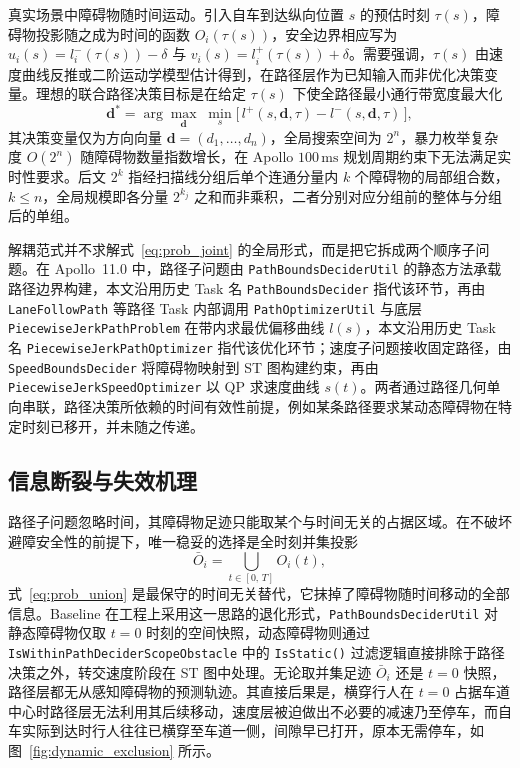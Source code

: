 \documentclass[a4paper,zihao=5]{ctexart}
\theoremstyle{definition}
\begin{document}
真实场景中障碍物随时间运动。引入自车到达纵向位置 $s$ 的预估时刻 $\tau(s)$，障碍物投影随之成为时间的函数 $O_i(\tau(s))$，安全边界相应写为 $u_i(s) = l_i^{-}(\tau(s)) - \delta$ 与 $v_i(s) = l_i^{+}(\tau(s)) + \delta$。需要强调，$\tau(s)$ 由速度曲线反推或二阶运动学模型估计得到，在路径层作为已知输入而非优化决策变量。理想的联合路径决策目标是在给定 $\tau(s)$ 下使全路径最小通行带宽度最大化
\begin{equation}
    \mathbf{d}^{*} = \arg\max_{\mathbf{d}} \;\min_{s} \big[\,l^{+}(s, \mathbf{d}, \tau) - l^{-}(s, \mathbf{d}, \tau)\,\big],
    \label{eq:prob_joint}
\end{equation}
其决策变量仅为方向向量 $\mathbf{d} = (d_1, \ldots, d_n)$，全局搜索空间为 $2^n$，暴力枚举复杂度 $O(2^n)$ 随障碍物数量指数增长，在 Apollo $100\,\mathrm{ms}$ 规划周期约束下无法满足实时性要求。后文 $2^k$ 指经扫描线分组后单个连通分量内 $k$ 个障碍物的局部组合数，$k \leq n$，全局规模即各分量 $2^{k_j}$ 之和而非乘积，二者分别对应分组前的整体与分组后的单组。

{\sloppy 解耦范式并不求解式~\eqref{eq:prob_joint} 的全局形式，而是把它拆成两个顺序子问题。在 Apollo~11.0 中，路径子问题由 \texttt{PathBoundsDeciderUtil} 的静态方法承载路径边界构建，本文沿用历史 Task 名 \texttt{PathBoundsDecider} 指代该环节，再由 \texttt{LaneFollowPath} 等路径 Task 内部调用 \texttt{PathOptimizerUtil} 与底层 \texttt{PiecewiseJerkPathProblem} 在带内求最优偏移曲线 $l(s)$，本文沿用历史 Task 名 \texttt{PiecewiseJerkPathOptimizer} 指代该优化环节；速度子问题接收固定路径，由 \texttt{SpeedBoundsDecider} 将障碍物映射到 ST 图构建约束，再由 \texttt{PiecewiseJerkSpeedOptimizer} 以 QP 求速度曲线 $s(t)$。两者通过路径几何单向串联，路径决策所依赖的时间有效性前提，例如某条路径要求某动态障碍物在特定时刻已移开，并未随之传递。\par}

\subsection{信息断裂与失效机理}
\label{subsec:union_projection}

路径子问题忽略时间，其障碍物足迹只能取某个与时间无关的占据区域。在不破坏避障安全性的前提下，唯一稳妥的选择是全时刻并集投影
\begin{equation}
    \bar{O}_i = \bigcup_{t \in [0,\,T]} O_i(t),
    \label{eq:prob_union}
\end{equation}
式~\eqref{eq:prob_union} 是最保守的时间无关替代，它抹掉了障碍物随时间移动的全部信息。Baseline 在工程上采用这一思路的退化形式，\texttt{PathBoundsDeciderUtil} 对静态障碍物仅取 $t{=}0$ 时刻的空间快照，动态障碍物则通过 \texttt{IsWithinPathDeciderScopeObstacle} 中的 \texttt{IsStatic()} 过滤逻辑直接排除于路径决策之外，转交速度阶段在 ST 图中处理。无论取并集足迹 $\bar{O}_i$ 还是 $t{=}0$ 快照，路径层都无从感知障碍物的预测轨迹。其直接后果是，横穿行人在 $t{=}0$ 占据车道中心时路径层无法利用其后续移动，速度层被迫做出不必要的减速乃至停车，而自车实际到达时行人往往已横穿至车道一侧，间隙早已打开，原本无需停车，如图~\ref{fig:dynamic_exclusion} 所示。
\end{document}
